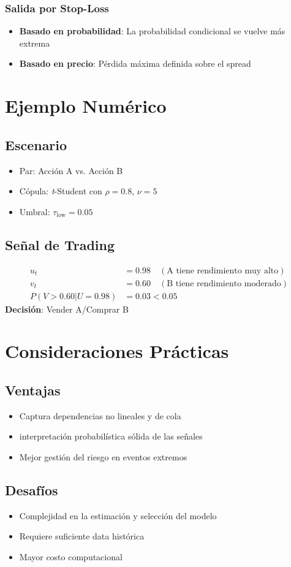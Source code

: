 \documentclass[12pt, a4paper]{myarticle}
\begin{document}
\subsubsection{Salida por Stop-Loss}
\begin{itemize}
    \item \textbf{Basado en probabilidad}: La probabilidad condicional se vuelve más extrema
    \item \textbf{Basado en precio}: Pérdida máxima definida sobre el spread
\end{itemize}

\section{Ejemplo Numérico}

\subsection{Escenario}
\begin{itemize}
    \item Par: Acción A vs. Acción B
    \item Cópula: \textit{t}-Student con \( \rho = 0.8 \), \( \nu = 5 \)
    \item Umbral: \( \tau_{\text{low}} = 0.05 \)
\end{itemize}

\subsection{Señal de Trading}
\begin{align*}
u_t &= 0.98 \quad (\text{A tiene rendimiento muy alto}) \\
v_t &= 0.60 \quad (\text{B tiene rendimiento moderado}) \\
P(V > 0.60 | U = 0.98) &= 0.03 < 0.05
\end{align*}
\textbf{Decisión}: Vender A/Comprar B

\section{Consideraciones Prácticas}

\subsection{Ventajas}
\begin{itemize}
    \item Captura dependencias no lineales y de cola
    \item interpretación probabilística sólida de las señales
    \item Mejor gestión del riesgo en eventos extremos
\end{itemize}

\subsection{Desafíos}
\begin{itemize}
    \item Complejidad en la estimación y selección del modelo
    \item Requiere suficiente data histórica
    \item Mayor costo computacional
\end{itemize}
\end{document}
